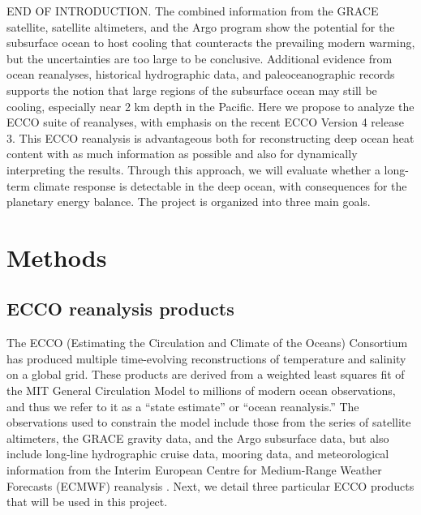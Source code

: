\documentclass[authoryear,round,12pt]{article}
\begin{document}
END OF INTRODUCTION.  The combined information from the GRACE
satellite, satellite altimeters, and the Argo program show the
potential for the subsurface ocean to host cooling that counteracts
the prevailing modern warming, but the uncertainties are too large to
be conclusive. Additional evidence from ocean reanalyses, historical
hydrographic data, and paleoceanographic records supports the notion
that large regions of the subsurface ocean may still be cooling,
especially near 2 km depth in the Pacific. Here we propose to analyze
the ECCO suite of reanalyses, with emphasis on the recent ECCO Version
4 release 3. This ECCO reanalysis is advantageous both for
reconstructing deep ocean heat content with as much information as
possible and also for dynamically interpreting the results. Through
this approach, we will evaluate whether a long-term climate response
is detectable in the deep ocean, with consequences for the planetary
energy balance. The project is organized into three main goals.


\section{Methods}
\label{sec:methods}

\subsection{ECCO reanalysis products}

The ECCO (Estimating the Circulation and Climate of the Oceans) Consortium has produced multiple time-evolving reconstructions of temperature and salinity on a global grid. These products are derived from a weighted least squares fit of the MIT General Circulation Model \citep[e.g., MITgcm][]{Marshall-Adcroft-1997:Hydrostatic} to millions of modern ocean observations, and thus we refer to it as a ``state estimate'' or ``ocean reanalysis.'' The observations used to constrain the model include those from the series of satellite altimeters, the GRACE gravity data, and the Argo subsurface data, but also include long-line hydrographic cruise data, mooring data, and meteorological information from the Interim European Centre for Medium-Range Weather Forecasts (ECMWF) reanalysis \citep{Dee-Uppala-2011:ERA}. Next, we detail three particular ECCO products that will be used in this project.
\end{document}
